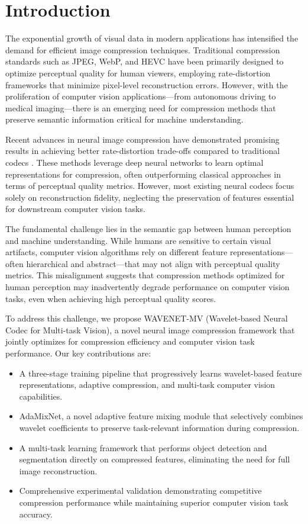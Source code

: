 \documentclass[conference]{IEEEtran}
\begin{document}
\section{Introduction}

The exponential growth of visual data in modern applications has intensified the demand for efficient image compression techniques. Traditional compression standards such as JPEG, WebP, and HEVC have been primarily designed to optimize perceptual quality for human viewers, employing rate-distortion frameworks that minimize pixel-level reconstruction errors. However, with the proliferation of computer vision applications—from autonomous driving to medical imaging—there is an emerging need for compression methods that preserve semantic information critical for machine understanding.

Recent advances in neural image compression have demonstrated promising results in achieving better rate-distortion trade-offs compared to traditional codecs \cite{balle2016end, balle2018variational}. These methods leverage deep neural networks to learn optimal representations for compression, often outperforming classical approaches in terms of perceptual quality metrics. However, most existing neural codecs focus solely on reconstruction fidelity, neglecting the preservation of features essential for downstream computer vision tasks.

The fundamental challenge lies in the semantic gap between human perception and machine understanding. While humans are sensitive to certain visual artifacts, computer vision algorithms rely on different feature representations—often hierarchical and abstract—that may not align with perceptual quality metrics. This misalignment suggests that compression methods optimized for human perception may inadvertently degrade performance on computer vision tasks, even when achieving high perceptual quality scores.

To address this challenge, we propose WAVENET-MV (Wavelet-based Neural Codec for Multi-task Vision), a novel neural image compression framework that jointly optimizes for compression efficiency and computer vision task performance. Our key contributions are:

\begin{itemize}
\item A three-stage training pipeline that progressively learns wavelet-based feature representations, adaptive compression, and multi-task computer vision capabilities.
\item AdaMixNet, a novel adaptive feature mixing module that selectively combines wavelet coefficients to preserve task-relevant information during compression.
\item A multi-task learning framework that performs object detection and segmentation directly on compressed features, eliminating the need for full image reconstruction.
\item Comprehensive experimental validation demonstrating competitive compression performance while maintaining superior computer vision task accuracy.
\end{itemize}
\end{document}
